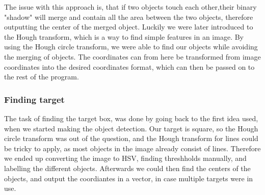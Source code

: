 The issue with this approach is, that if two objects touch each other,their binary "shadow" will merge and contain all the area between the two objects, therefore outputting the center of the merged object.
Luckily we were later introduced to the Hough transform, which is a way to find simple features in an image.
By using the Hough circle transform, we were able to find our objects while avoiding the merging of objects.
The coordinates can from here be transformed from image coordinates into the desired coordinates format, which can then be passed on to the rest of the program.

\subsubsection{Finding target}
The task of finding the target box, was done by going back to the first idea used, when we started making the object detection. 
Our target is square, so the Hough circle transform was out of the question, and the Hough transform for lines could be tricky to apply, as most objects in the image already consist of lines.
Therefore we ended up converting the image to HSV, finding threshholds manually, and labelling the different objects.
Afterwards we could then find the centers of the objects, and output the coordiantes in a vector, in case multiple targets were in use. 